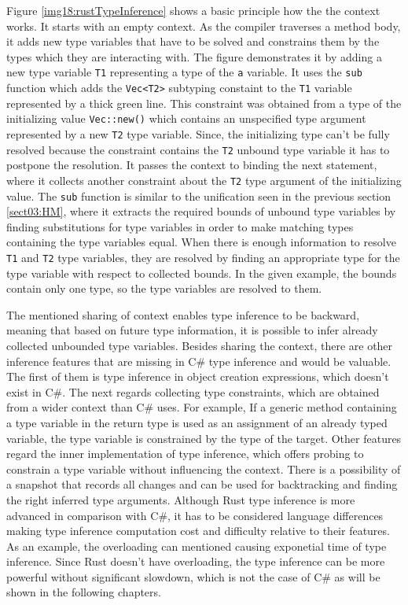 Figure \ref{img18:rustTypeInference} shows a basic principle how the the context works. 
It starts with an empty context. 
As the compiler traverses a method body, it adds new type variables that have to be solved and constrains them by the types which they are interacting with. 
The figure demonstrates it by adding a new type variable \texttt{T1} representing a type of the \texttt{a} variable.
It uses the \texttt{sub} function which adds the \texttt{Vec<T2>} subtyping constaint to the \texttt{T1} variable represented by a thick green line.
This constraint was obtained from a type of the initializing value \texttt{Vec::new()} which contains an unspecified type argument represented by a new \texttt{T2} type variable.
Since, the initializing type can't be fully resolved because the constraint contains the \texttt{T2} unbound type variable it has to postpone the resolution. 
It passes the context to binding the next statement, where it collects another constraint about the \texttt{T2} type argument of the initializing value.
The \texttt{sub} function is similar to the unification seen in the previous section \ref{sect03:HM}, where it extracts the required bounds of unbound type variables by finding substitutions for type variables in order to make matching types containing the type variables equal.
When there is enough information to resolve \texttt{T1} and \texttt{T2} type variables, they are resolved by finding an appropriate type for the type variable with respect to collected bounds.
In the given example, the bounds contain only one type, so the type variables are resolved to them.
\par
The mentioned sharing of context enables type inference to be backward, meaning that based on future type information, it is possible to infer already collected unbounded type variables. 
Besides sharing the context, there are other inference features that are missing in C\# type inference and would be valuable. 
The first of them is type inference in object creation expressions, which doesn't exist in C\#. 
The next regards collecting type constraints, which are obtained from a wider context than C\# uses. 
For example, If a generic method containing a type variable in the return type is used as an assignment of an already typed variable, the type variable is constrained by the type of the target. Other features regard the inner implementation of type inference, which offers probing to constrain a type variable without influencing the context. 
There is a possibility of a snapshot that records all changes and can be used for backtracking and finding the right inferred type arguments.
Although Rust type inference is more advanced in comparison with C\#, it has to be considered language differences making type inference computation cost and difficulty relative to their features. 
As an example, the overloading can mentioned causing exponetial time of type inference. 
Since Rust doesn't have overloading, the type inference can be more powerful without significant slowdown, which is not the case of C\# as will be shown in the following chapters.


